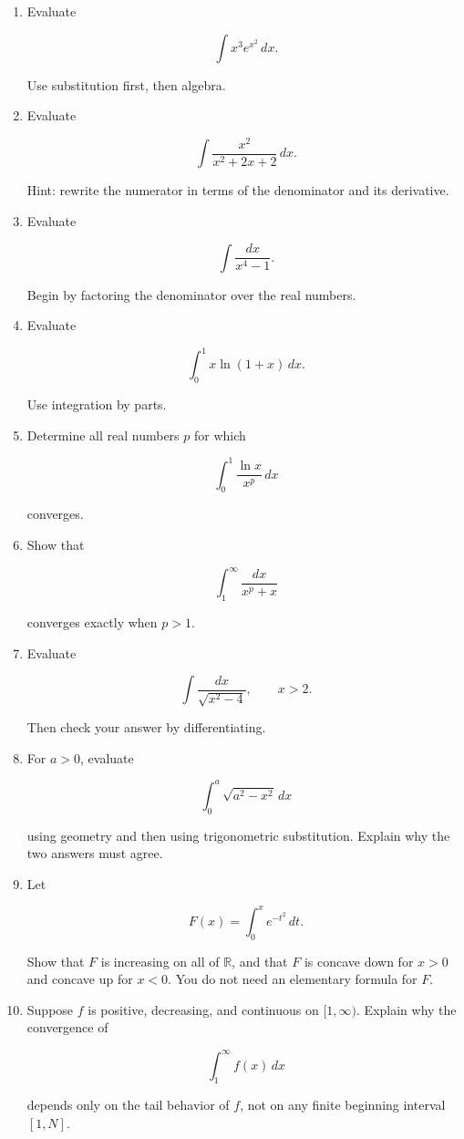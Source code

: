 \begin{enumerate}
\item Evaluate

\[
\int x^3e^{x^2}\,dx.
\]

Use substitution first, then algebra.

\item Evaluate

\[
\int \frac{x^2}{x^2+2x+2}\,dx.
\]

Hint: rewrite the numerator in terms of the denominator and its derivative.

\item Evaluate

\[
\int \frac{dx}{x^4-1}.
\]

Begin by factoring the denominator over the real numbers.

\item Evaluate

\[
\int_0^1 x\ln(1+x)\,dx.
\]

Use integration by parts.

\item Determine all real numbers \(p\) for which

\[
\int_0^1 \frac{\ln x}{x^p}\,dx
\]

converges.

\item Show that

\[
\int_1^\infty \frac{dx}{x^p+x}
\]

converges exactly when \(p>1\).

\item Evaluate

\[
\int \frac{dx}{\sqrt{x^2-4}},
\qquad x>2.
\]

Then check your answer by differentiating.

\item For \(a>0\), evaluate

\[
\int_0^a \sqrt{a^2-x^2}\,dx
\]

using geometry and then using trigonometric substitution.  Explain why the two answers
must agree.

\item Let

\[
F(x)=\int_0^x e^{-t^2}\,dt.
\]

Show that \(F\) is increasing on all of \(\mathbb R\), and that \(F\) is concave down for
\(x>0\) and concave up for \(x<0\).  You do not need an elementary formula for \(F\).

\item Suppose \(f\) is positive, decreasing, and continuous on \([1,\infty)\).  Explain why
the convergence of

\[
\int_1^\infty f(x)\,dx
\]

depends only on the tail behavior of \(f\), not on any finite beginning interval
\([1,N]\).
\end{enumerate}

